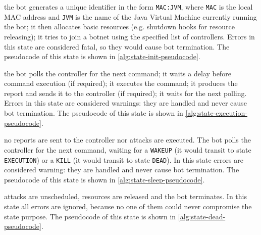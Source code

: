 \begin{description}
  \setlength\itemsep{1em}

  \item[INIT] the bot generates a unique identifier in the form \texttt{MAC:JVM}, where \texttt{MAC} is the local MAC address and \texttt{JVM} is the name of the Java Virtual Machine currently running the bot; it then allocates basic resources (e.g. shutdown hooks for resource releasing); it tries to join a botnet using the specified list of controllers.
  Errors in this state are considered fatal, so they would cause bot termination. The pseudocode of this state is shown in \ref{alg:state-init-pseudocode}.

  \item[EXECUTION] the bot polls the controller for the next command; it waits a delay before command execution (if required); it executes the command; it produces the report and sends it to the controller (if required); it waits for the next polling.
  Errors in this state are considered warnings: they are handled and never cause bot termination. The pseudocode of this state is shown in \ref{alg:state-execution-pseudocode}.

  \item[SLEEP] no reports are sent to the controller nor attacks are executed. The bot polls the controller for the next command, waiting for a \texttt{WAKEUP} (it would transit to state \texttt{EXECUTION}) or a \texttt{KILL} (it would transit to state \texttt{DEAD}).
  In this state errors are considered warning: they are handled and never cause bot termination. The pseudocode of this state is shown in \ref{alg:state-sleep-pseudocode}.

  \item[DEAD] attacks are unscheduled, resources are released and the bot terminates. In this state all errors are ignored, because no one of them could never compromise the state purpose. The pseudocode of this state is shown in \ref{alg:state-dead-pseudocode}.

\end{description}

\bigskip

